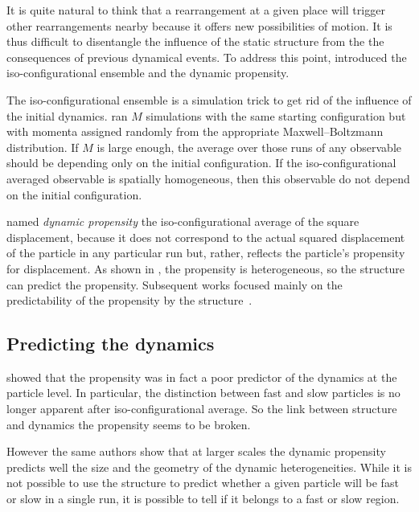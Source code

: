 It is quite natural to think that a rearrangement at a given place will trigger other rearrangements nearby because it offers new possibilities of motion. It is thus difficult to disentangle the influence of the static structure from the the consequences of previous dynamical events. To address this point, \citet{Widmer-Cooper2005} introduced the iso-configurational ensemble and the dynamic propensity.

The iso-configurational ensemble is a simulation trick to get rid of the influence of the initial dynamics. \citet{Widmer-Cooper2005} ran $M$ simulations with the same starting configuration but with momenta assigned randomly from the appropriate Maxwell–Boltzmann distribution. If $M$ is large enough, the average over those runs of any observable should be depending only on the initial configuration. If the iso-configurational averaged observable is spatially homogeneous, then this observable do not depend on the initial configuration.

\citet{Widmer-Cooper2005} named \emph{dynamic propensity} the iso-configurational average of the square displacement, because it does not correspond to the actual squared displacement of the particle in any particular run but, rather, reflects the particle's propensity for displacement. As shown in , the propensity is heterogeneous, so the structure can predict the propensity. Subsequent works focused mainly on the predictability of the propensity by the structure~\citep{Widmer-Cooper2007, Matharoo2006, Coslovich2006, Appignanesi2006, RodriguezFris2007, Hedges2007, Downton2007}.

\subsection{Predicting the dynamics}

\citet{Berthier2007} showed that the propensity was in fact a poor predictor of the dynamics at the particle level. In particular, the distinction between fast and slow particles is no longer apparent after iso-configurational average. So the link between structure and dynamics  the propensity seems to be broken. 

However the same authors show that at larger scales the dynamic propensity predicts well the size and the geometry of the dynamic heterogeneities. While it is not possible to use the structure to predict whether a given particle will be fast or slow in a single run, it is possible to tell if it belongs to a fast or slow region.

